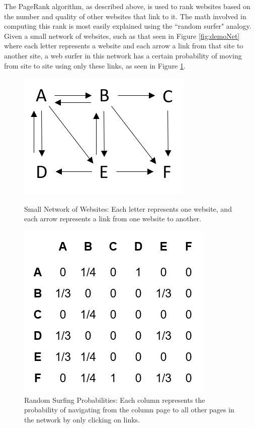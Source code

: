 \documentclass[12pt]{report}   %
\begin{document}
The PageRank algorithm, as described above, is used to rank websites based on the number and quality of other websites that link to it. The math involved in computing this rank is most easily explained using the ``random surfer" analogy. Given a small network of websites, such as that seen in Figure \ref{fig:demoNet} where each letter represents a website and each arrow a link from that site to another site, a web surfer in this network has a certain probability of moving from site to site using only these links, as seen in Figure \ref{fig:demoProb}. 
\begin{figure}[h]
    \centering
    \begin{minipage}[t]{0.48\textwidth}
	\captionsetup{font=scriptsize}
        \centering
        \includegraphics[scale=0.8]{Marbut_DemoNetwork.png} %
        \caption{Small Network of Websites: Each letter represents one website, and each arrow represents a link from one website to another.}
	  \label{fig:demoNet}
    \end{minipage}\hfill
    \begin{minipage}[t]{0.48\textwidth}
	\captionsetup{font=scriptsize}
        \centering
        \includegraphics[scale=0.8]{Marbut_DemoMatrix.png} %
        \caption{Random Surfing Probabilities: Each column represents the probability of navigating from the column page to all other pages in the network by only clicking on links.}
	  \label{fig:demoProb}
    \end{minipage}
\end{figure}
\FloatBarrier
\end{document}
